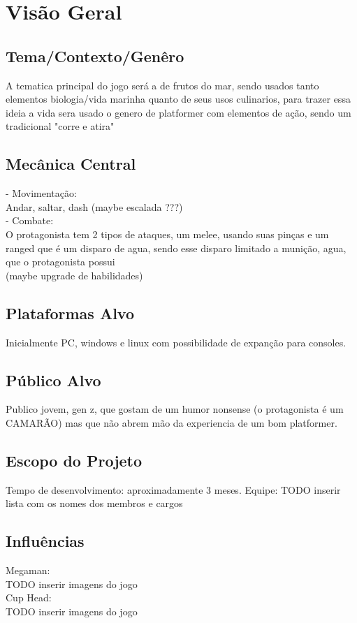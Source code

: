 
\section{Visão Geral}%
    \subsection{Tema/Contexto/Genêro}%
    A tematica principal do jogo será a de frutos do mar, sendo usados tanto elementos biologia/vida marinha quanto de seus usos culinarios, para trazer essa ideia a vida sera usado o genero de platformer com elementos de ação, sendo um tradicional "corre e atira" 

    \subsection{Mecânica Central}%
- Movimentação:\\
    Andar, saltar, dash (maybe escalada ???)\\
- Combate:\\
    O protagonista tem 2 tipos de ataques, um melee, usando suas pinças e um ranged que é um disparo de agua, sendo esse disparo limitado a munição, agua, que o protagonista possui \\
    (maybe upgrade de habilidades)\\

    \subsection{Plataformas Alvo}%
Inicialmente PC, windows e linux com possibilidade de expanção para consoles.
    \subsection{Público Alvo}%
Publico jovem, gen z, que gostam de um humor nonsense (o protagonista é um CAMARÃO) mas que não abrem mão da experiencia de um bom platformer.
    \subsection{Escopo do Projeto}%
Tempo de desenvolvimento: aproximadamente 3 meses.
Equipe:
    TODO inserir lista com os nomes dos membros e cargos
    \subsection{Influências}%
Megaman:\\ 
TODO inserir imagens do jogo\\
Cup Head:\\
TODO inserir imagens do jogo\\

